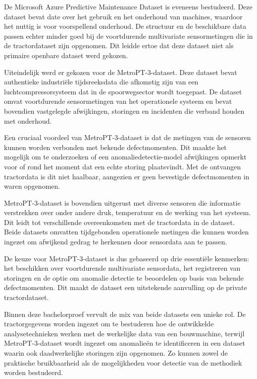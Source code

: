 De Microsoft Azure Predictive Maintenance Dataset is eveneens bestudeerd. Deze dataset bevat date over het gebruik en het onderhoud van machines, waardoor het nuttig is voor voorspellend onderhoud. De structuur en de beschikbare data passen echter minder goed bij de voortdurende multivariate sensormetingen die in de tractordataset zijn opgenomen. Dit leidde ertoe dat deze dataset niet als primaire openbare dataset werd gekozen.

Uiteindelijk werd er gekozen voor de MetroPT-3-dataset. Deze dataset bevat authentieke industriële tijdsreeksdata die afkomstig zijn van een luchtcompressorsysteem dat in de spoorwegsector wordt toegepast. De dataset omvat voortdurende sensormetingen van het operationele systeem en bevat bovendien vastgelegde afwijkingen, storingen en incidenten die verband houden met onderhoud.

Een cruciaal voordeel van MetroPT-3-dataset is dat de metingen van de sensoren kunnen worden verbonden met bekende defectmomenten. Dit maakte het mogelijk om te onderzoeken of een anomaliedetectie-model afwijkingen opmerkt voor of rond het moment dat een echte storing plaatsvindt. Met de ontvangen tractordata is dit niet haalbaar, aangezien er geen bevestigde defectmomenten in waren opgenomen.

MetroPT-3-dataset is bovendien uitgerust met diverse sensoren die informatie verstrekken over onder andere druk, temperatuur en de werking van het systeem. Dit leidt tot verschillende overeenkomsten met de tractordata in de dataset. Beide datasets omvatten tijdgebonden operationele metingen die kunnen worden ingezet om afwijkend gedrag te herkennen door sensordata aan te passen.

De keuze voor MetroPT-3-dataset is dus gebaseerd op drie essentiële kenmerken: het beschikken over voortdurende multivariate sensordata, het registreren van storingen en de optie om anomalie detectie te beoordelen op basis van bekende defectmomenten. Dit maakt de dataset een uitstekende aanvulling op de private tractordataset.

Binnen deze bachelorproef vervult de mix van beide datasets een unieke rol. De tractorgegevens worden ingezet om te bestuderen hoe de ontwikkelde analysetechnieken werken met de werkelijke data van een bouwmachine, terwijl MetroPT-3-dataset wordt ingezet om anomalieën te identificeren in een dataset waarin ook daadwerkelijke storingen zijn opgenomen. Zo kunnen zowel de praktische bruikbaarheid als de mogelijkheden voor detectie van de methodiek worden bestudeerd.

